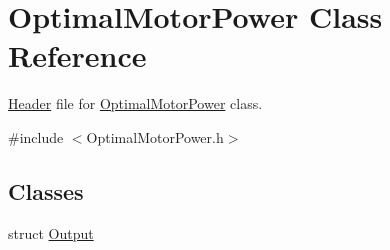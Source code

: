 \hypertarget{class_optimal_motor_power}{}\section{Optimal\+Motor\+Power Class Reference}
\label{class_optimal_motor_power}


\hyperlink{class_header}{Header} file for \hyperlink{class_optimal_motor_power}{Optimal\+Motor\+Power} class.  




{\ttfamily \#include $<$Optimal\+Motor\+Power.\+h$>$}

\subsection*{Classes}
\begin{DoxyCompactItemize}
\item 
struct \hyperlink{struct_optimal_motor_power_1_1_output}{Output}
\end{DoxyCompactItemize}
